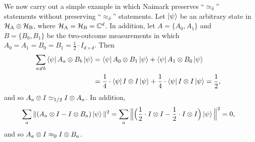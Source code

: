 \begin{example}\label{ex:easy-but-long}
We now carry out a simple example
in which Naimark preserves ``$\simeq_\delta$'' statements without preserving ``$\approx_\delta$'' statements.
Let $\ket{\psi}$ be an arbitrary state in $\mathcal{H}_{\mathrm{A}} \otimes \mathcal{H}_{\mathrm{B}}$,
where $\mathcal{H}_{\mathrm{A}} = \mathcal{H}_{\mathrm{B}} = \mathbb C^d$.
In addition, let $A = \{A_0, A_1\}$ and $B = \{B_0, B_1\}$ be the two-outcome measurements
in which $A_0 = A_1 = B_0 = B_1 = \frac{1}{2} \cdot I_{d \times d}$.
Then
\begin{align*}
\sum_{a \neq b} \bra{\psi} A_a \otimes B_b\ket{\psi}
&= \bra{\psi} A_0 \otimes B_1\ket{\psi} + \bra{\psi} A_1 \otimes B_0\ket{\psi}\\
&= \frac{1}{4} \cdot \bra{\psi} I \otimes I \ket{\psi} + \frac{1}{4} \cdot \bra{\psi} I \otimes I \ket{\psi}
= \frac{1}{2},
\end{align*}
and so $A_a \otimes I \simeq_{1/2} I \otimes A_a$.
In addition,
\begin{equation*}
\sum_a \Vert (A_a \otimes I - I \otimes B_a) \ket{\psi}\Vert^2
= \sum_a \Big\Vert \Big(\frac{1}{2} \cdot I \otimes I - \frac{1}{2} \cdot I \otimes I\Big) \ket{\psi}\Big\Vert^2
= 0,
\end{equation*}
and so $A_a \otimes I \approx_0 I \otimes B_a$.


\end{example}
